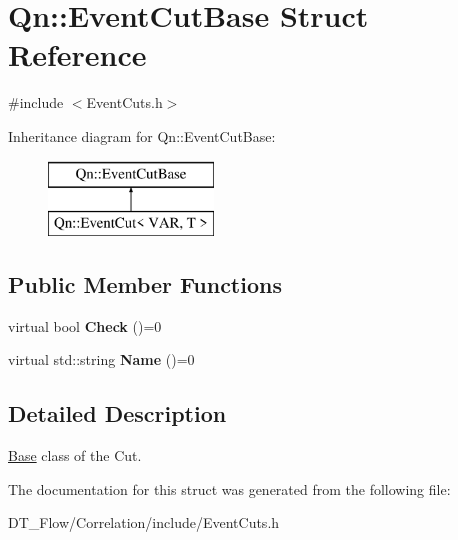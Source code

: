 \hypertarget{structQn_1_1EventCutBase}{}\section{Qn\+:\+:Event\+Cut\+Base Struct Reference}
\label{structQn_1_1EventCutBase}


{\ttfamily \#include $<$Event\+Cuts.\+h$>$}

Inheritance diagram for Qn\+:\+:Event\+Cut\+Base\+:\begin{figure}[H]
\begin{center}
\leavevmode
\includegraphics[height=2.000000cm]{structQn_1_1EventCutBase}
\end{center}
\end{figure}
\subsection*{Public Member Functions}
\begin{DoxyCompactItemize}
\item 
\mbox{\label{structQn_1_1EventCutBase_a01de6b92d0ac4e6b1d9c1d4a55bf34df}} 
virtual bool {\bfseries Check} ()=0
\item 
\mbox{\label{structQn_1_1EventCutBase_a2c91ace130ad1d54024e1842e7ac764c}} 
virtual std\+::string {\bfseries Name} ()=0
\end{DoxyCompactItemize}


\subsection{Detailed Description}
\mbox{\hyperlink{classBase}{Base}} class of the Cut. 

The documentation for this struct was generated from the following file\+:\begin{DoxyCompactItemize}
\item 
D\+T\+\_\+\+Flow/\+Correlation/include/Event\+Cuts.\+h\end{DoxyCompactItemize}
